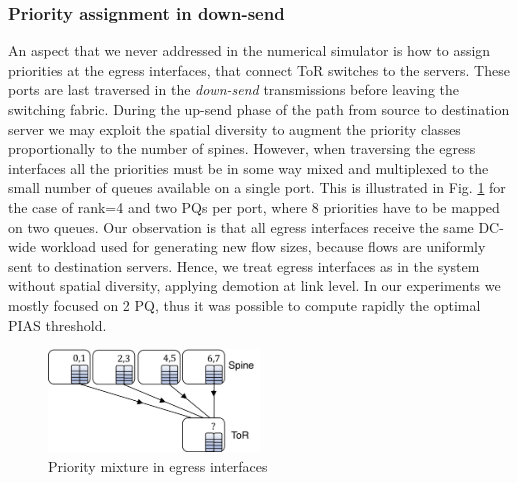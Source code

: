 \subsubsection{Priority assignment in down-send}
\label{sec:downsend-priority}
An aspect that we never addressed in the numerical simulator is how to assign priorities at the egress interfaces, that connect ToR switches to the servers. These ports are last traversed in the \emph{down-send} transmissions before leaving the switching fabric. During the up-send phase of the path from source to destination server we may exploit the spatial diversity to augment the priority classes proportionally to the number of spines. However, when traversing the egress interfaces all the priorities must be in some way mixed and multiplexed to the small number of queues available on a single port. This is illustrated in Fig. \ref{fig:downsend} for the case of rank=4 and two PQs per port, where 8 priorities have to be mapped on two queues. Our observation is that all egress interfaces receive the same DC-wide workload used for generating new flow sizes, because flows are uniformly sent to destination servers. Hence, we treat egress interfaces as in the system without spatial diversity, applying demotion at link level. In our experiments we mostly focused on 2 PQ, thus it was possible to compute rapidly the optimal PIAS threshold.
\begin{figure}
	\centering	
	\includegraphics[width=0.5\textwidth]{Chapter4/Figures/downsend}
	\caption{Priority mixture in egress interfaces}
	\label{fig:downsend}
\end{figure}%
